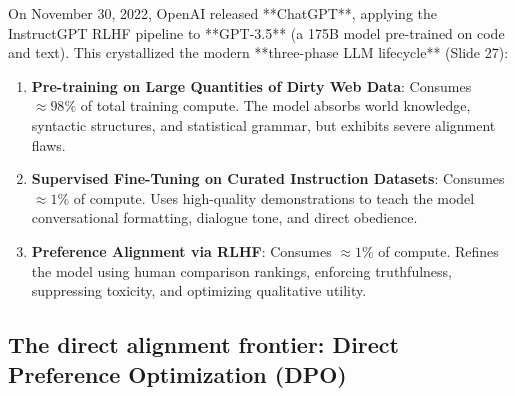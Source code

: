 \documentclass[../../../main.tex]{subfiles}
\begin{document}
On November 30, 2022, OpenAI released **ChatGPT**, applying the InstructGPT RLHF pipeline to **GPT-3.5** (a 175B model pre-trained on code and text). This crystallized the modern **three-phase LLM lifecycle** (Slide 27):
\begin{enumerate}
    \item \textbf{Pre-training on Large Quantities of Dirty Web Data}: Consumes $\approx 98\%$ of total training compute. The model absorbs world knowledge, syntactic structures, and statistical grammar, but exhibits severe alignment flaws.
    \item \textbf{Supervised Fine-Tuning on Curated Instruction Datasets}: Consumes $\approx 1\%$ of compute. Uses high-quality demonstrations to teach the model conversational formatting, dialogue tone, and direct obedience.
    \item \textbf{Preference Alignment via RLHF}: Consumes $\approx 1\%$ of compute. Refines the model using human comparison rankings, enforcing truthfulness, suppressing toxicity, and optimizing qualitative utility.
\end{enumerate}

\subsection{The direct alignment frontier: Direct Preference Optimization (DPO)}
\label{subsec:dpo_direct_alignment_frontier}
\end{document}
